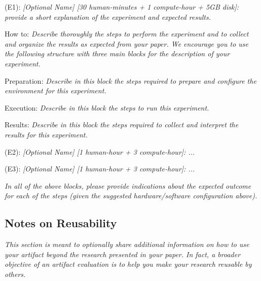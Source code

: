 \begin{compactdesc}

    \item[(E1):] \textit{[Optional Name] [30 human-minutes + 1 compute-hour + 5GB disk]:
    provide a short explanation of the experiment and expected results.}

    \begin{asparadesc}
        \item[How to:]  \textit{Describe thoroughly the steps to perform the
        experiment and to collect and organize the results as expected from your
        paper. We encourage you to use the following structure with three main
        blocks for the description of your experiment.}

        \item[Preparation:] \textit{Describe in this block the steps required to
        prepare and configure the environment for this experiment.}

        \item[Execution:]
        \textit{Describe in this block the steps to run this experiment.}

        \item[Results:] \textit{Describe in this block the steps required to
        collect and interpret the results for this experiment.}
    \end{asparadesc}

    \item[(E2):] \textit{[Optional Name] [1 human-hour + 3 compute-hour]: ...}

    \item[(E3):] \textit{[Optional Name] [1 human-hour + 3 compute-hour]: ...}

\end{compactdesc}

\textit{In all of the above blocks, please provide indications about the
 expected outcome for each of the steps (given the suggested hardware/software
 configuration above).}

\subsection{Notes on Reusability}
\label{sec:reuse}
\textit{This section is meant to optionally share additional
information on how to use your artifact beyond the research presented in your
paper. In fact, a broader objective of an artifact evaluation is to help you
make your research reusable by others.}

